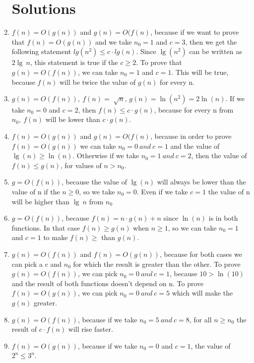 \documentclass{article}
\begin{document}
\begin{enumerate}
\section*{Solutions}
	\item $f(n) = O(g(n))$ and $g(n) = O(f(n)$, because if we want to prove that $f(n) = O(g(n))$ and we take $n_0 = 1$ and $c = 3$, then we get the following statement $lg(n^2) \leq c \cdot lg(n)$. Since $\lg(n^2)$ can be written as $2 \lg\ n$, this statement is true if the $c \geq 2$. To prove that $g(n) = O(f(n))$, we can take $n_0 = 1$ and $c = 1$. This will be true, because $f(n)$ will be twice the value of $g(n)$ for every n.
    \item $g(n) = O(f(n)), \> f(n) = \sqrt[]{n}$, $g(n) = \ln(n^2) = 2 \ln(n)$. If we take $n_0 = 0$ and $c = 2$, then $f(n) \leq c \cdot g(n)$, because for every n from $n_0, \> f(n)$ will be lower than $c \cdot g(n)$.
    \item $f(n) = O(g(n))$ and $g(n) = O(f(n)$, because in order to prove $f(n) = O(g(n))$ we can take $n_0 = 0 \> and \> c = 1$ and the value of $\lg(n) \geq \ln(n)$. Otherwise if we take $n_0 = 1 \> and \> c = 2$, then the value of $f(n) \leq g(n)$, for values of $n > n_0$.
    \item $g = O(f(n)) $, because the value of $\lg(n)$ will always be lower than the value of n if the $n \geq 0$, so we take $n_0 = 0$. Even if we take $c = 1$ the value of n will be higher than $\lg\ n$ from $n_0$
    \item $g = O(f(n))$, because $f(n) = n \cdot g(n) + n$ since $\ln(n)$ is in both functions. In that case $f(n) \geq g(n)$ when $n \geq 1$, so we can take $n_0 = 1$ and $c = 1$ to make $f(n) \geq$ than $g(n)$.
    \item $g(n) = O(f(n))$ and $f(n) = O(g(n))$, because for both cases we can pick a c and $n_0$ for which the result is greater than the other. To prove $g(n) = O(f(n))$, we can pick $n_0 = 0 \> and \> c = 1$, because $10 > \ln(10)$ and the result of both functions doesn't depend on n. To prove $f(n) = O(g(n))$, we can pick $n_0 = 0 \> and \> c = 5$ which will make the $g(n)$ greater.
    \item $g(n) = O(f(n))$, because if we take $n_0 = 5 \> and \> c = 8$, for all $n \geq n_0$ the result of $c \cdot f(n)$ will rise faster.
    \item $f(n) = O(g(n))$, because if we take $n_0 = 0$ and $c = 1$, the value of $2^n \leq 3^n$.
\end{enumerate}
\end{document}
